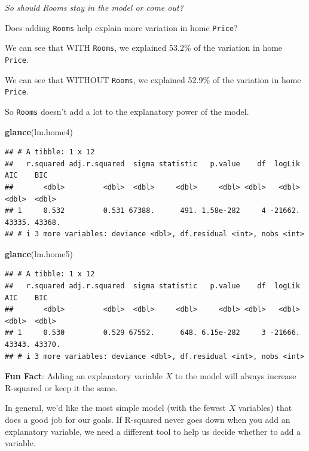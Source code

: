 \documentclass[
]{book}
\newenvironment{Shaded}{\begin{snugshade}}{\end{snugshade}}
\newcommand{\FunctionTok}[1]{\textcolor[rgb]{0.13,0.29,0.53}{\textbf{#1}}}
\newcommand{\NormalTok}[1]{#1}
\begin{document}
\emph{So should Rooms stay in the model or come out?}

Does adding \texttt{Rooms} help explain more variation in home \texttt{Price}?

We can see that WITH \texttt{Rooms}, we explained 53.2\% of the variation in home \texttt{Price}.

We can see that WITHOUT \texttt{Rooms}, we explained 52.9\% of the variation in home \texttt{Price}.

So \texttt{Rooms} doesn't add a lot to the explanatory power of the model.

\begin{Shaded}
\begin{Highlighting}[]
\FunctionTok{glance}\NormalTok{(lm.home4)}
\end{Highlighting}
\end{Shaded}

\begin{verbatim}
## # A tibble: 1 x 12
##   r.squared adj.r.squared  sigma statistic   p.value    df  logLik    AIC    BIC
##       <dbl>         <dbl>  <dbl>     <dbl>     <dbl> <dbl>   <dbl>  <dbl>  <dbl>
## 1     0.532         0.531 67388.      491. 1.58e-282     4 -21662. 43335. 43368.
## # i 3 more variables: deviance <dbl>, df.residual <int>, nobs <int>
\end{verbatim}

\begin{Shaded}
\begin{Highlighting}[]
\FunctionTok{glance}\NormalTok{(lm.home5)}
\end{Highlighting}
\end{Shaded}

\begin{verbatim}
## # A tibble: 1 x 12
##   r.squared adj.r.squared  sigma statistic   p.value    df  logLik    AIC    BIC
##       <dbl>         <dbl>  <dbl>     <dbl>     <dbl> <dbl>   <dbl>  <dbl>  <dbl>
## 1     0.530         0.529 67552.      648. 6.15e-282     3 -21666. 43343. 43370.
## # i 3 more variables: deviance <dbl>, df.residual <int>, nobs <int>
\end{verbatim}

\textbf{Fun Fact}: Adding an explanatory variable \(X\) to the model will always increase R-squared or keep it the same.

In general, we'd like the most simple model (with the fewest \(X\) variables) that does a good job for our goals. If R-squared never goes down when you add an explanatory variable, we need a different tool to help us decide whether to add a variable.
\end{document}
